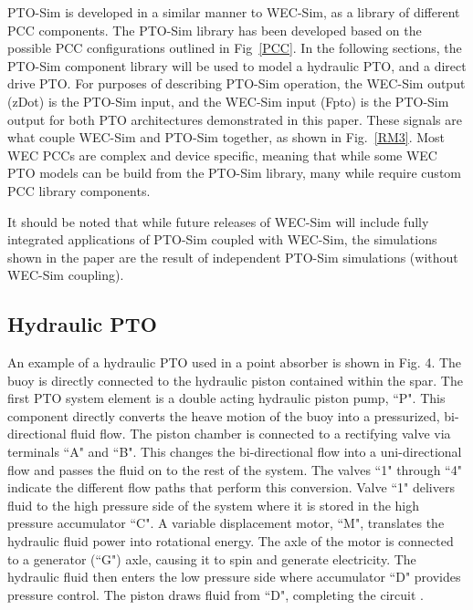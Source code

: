 \documentclass[twocolumn,10pt]{asme2e}
\begin{document}
PTO-Sim is developed in a similar manner to WEC-Sim, as a library of different PCC components. The PTO-Sim library has been developed based on the possible PCC configurations outlined in Fig~\ref{PCC}. In the following sections, the PTO-Sim component library will be used to model a hydraulic PTO, and a direct drive PTO. For purposes of describing PTO-Sim operation, the WEC-Sim output (zDot) is the PTO-Sim input, and the WEC-Sim input (Fpto) is the PTO-Sim output for both PTO architectures demonstrated in this paper.  These signals are what couple WEC-Sim and PTO-Sim together, as shown in Fig.~\ref{RM3}. Most WEC PCCs are complex and device specific, meaning that while some WEC PTO models can be build from the PTO-Sim library, many while require custom PCC library components. 

It should be noted that while future releases of WEC-Sim will include fully integrated applications of PTO-Sim coupled with WEC-Sim, the simulations shown in the paper are the result of independent PTO-Sim simulations (without WEC-Sim coupling). 




\subsection*{Hydraulic PTO}
An example of a hydraulic PTO used in a point absorber is shown in Fig. 4.  The buoy is directly connected to the hydraulic piston contained within the spar. The first PTO system element is a double acting hydraulic piston pump, ``P". This component directly converts the heave motion of the buoy into a pressurized, bi-directional fluid flow. The piston chamber is connected to a rectifying valve via terminals ``A" and ``B". This changes the bi-directional flow into a uni-directional flow and passes the fluid on to the rest of the system. The valves ``1" through ``4" indicate the different flow paths that perform this conversion. Valve ``1" delivers fluid to the high pressure side of the system where it is stored in the high pressure accumulator ``C". A variable displacement motor, ``M", translates the hydraulic fluid power into rotational energy. The axle of the motor is connected to a generator (``G") axle, causing it to spin and generate electricity.
The hydraulic fluid then enters the low pressure side where accumulator ``D" provides pressure control. The piston draws fluid from ``D", completing the circuit \cite{casey2013modeling}.
\end{document}
